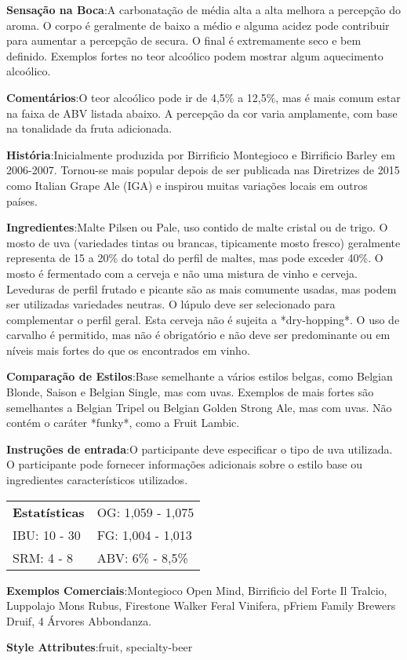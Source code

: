 \textbf{Sensação na Boca}:A carbonatação de média alta a alta melhora a percepção do aroma. O corpo é geralmente de baixo a médio e alguma acidez pode contribuir para aumentar a percepção de secura. O final é extremamente seco e bem definido. Exemplos fortes no teor alcoólico podem mostrar algum aquecimento alcoólico.

\textbf{Comentários}:O teor alcoólico pode ir de 4,5\% a 12,5\%, mas é mais comum estar na faixa de ABV listada abaixo. A percepção da cor varia amplamente, com base na tonalidade da fruta adicionada.

\textbf{História}:Inicialmente produzida por Birrificio Montegioco e Birrificio Barley em 2006-2007. Tornou-se mais popular depois de ser publicada nas Diretrizes de 2015 como Italian Grape Ale (IGA) e inspirou muitas variações locais em outros países.

\textbf{Ingredientes}:Malte Pilsen ou Pale, uso contido de malte cristal ou de trigo. O mosto de uva (variedades tintas ou brancas, tipicamente mosto fresco) geralmente representa de 15 a 20\% do total do perfil de maltes, mas pode exceder 40\%. O mosto é fermentado com a cerveja e não uma mistura de vinho e cerveja. Leveduras de perfil frutado e picante são as mais comumente usadas, mas podem ser utilizadas variedades neutras. O lúpulo deve ser selecionado para complementar o perfil geral. Esta cerveja não é sujeita a *dry-hopping*. O uso de carvalho é permitido, mas não é obrigatório e não deve ser predominante ou em níveis mais fortes do que os encontrados em vinho.

\textbf{Comparação de Estilos}:Base semelhante a vários estilos belgas, como Belgian Blonde, Saison e Belgian Single, mas com uvas. Exemplos de mais fortes são semelhantes a Belgian Tripel ou Belgian Golden Strong Ale, mas com uvas. Não contém o caráter *funky*, como a Fruit Lambic.

\textbf{Instruções de entrada}:O participante deve especificar o tipo de uva utilizada. O participante pode fornecer informações adicionais sobre o estilo base ou ingredientes característicos utilizados.

\begin{tabular}{@{}p{35mm}p{35mm}@{}}
  \textbf{Estatísticas} & OG: 1,059 - 1,075 \\
  IBU: 10 - 30  & FG: 1,004 - 1,013  \\
  SRM: 4 - 8  & ABV: 6\% - 8,5\%
\end{tabular}

\textbf{Exemplos Comerciais}:Montegioco Open Mind, Birrificio del Forte Il Tralcio, Luppolajo Mons Rubus, Firestone Walker Feral Vinifera, pFriem Family Brewers Druif, 4 Árvores Abbondanza.

\textbf{Style Attributes}:fruit, specialty-beer
